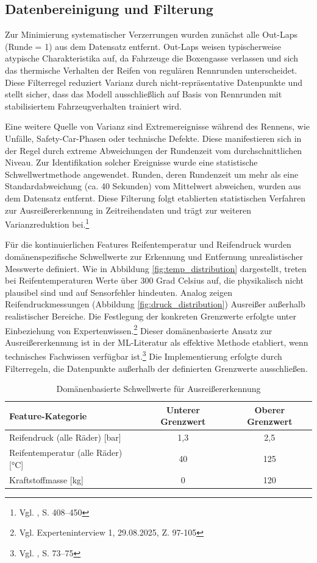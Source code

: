 \subsection{Datenbereinigung und Filterung}

Zur Minimierung systematischer Verzerrungen wurden zunächst alle Out-Laps (Runde = 1) aus dem Datensatz entfernt. Out-Laps weisen typischerweise atypische Charakteristika auf, da Fahrzeuge die Boxengasse verlassen und sich das thermische Verhalten der Reifen von regulären Rennrunden unterscheidet. Diese Filterregel reduziert Varianz durch nicht-repräsentative Datenpunkte und stellt sicher, dass das Modell ausschließlich auf Basis von Rennrunden mit stabilisiertem Fahrzeugverhalten trainiert wird.

Eine weitere Quelle von Varianz sind Extremereignisse während des Rennens, wie Unfälle, Safety-Car-Phasen oder technische Defekte. Diese manifestieren sich in der Regel durch extreme Abweichungen der Rundenzeit vom durchschnittlichen Niveau. Zur Identifikation solcher Ereignisse wurde eine statistische Schwellwertmethode angewendet. Runden, deren Rundenzeit um mehr als eine Standardabweichung (ca. 40 Sekunden) vom Mittelwert abweichen, wurden aus dem Datensatz entfernt. Diese Filterung folgt etablierten statistischen Verfahren zur Ausreißererkennung in Zeitreihendaten und trägt zur weiteren Varianzreduktion bei.\footnote{Vgl. \cite{Box2015}, S. 408–450}

Für die kontinuierlichen Features Reifentemperatur und Reifendruck wurden domänenspezifische Schwellwerte zur Erkennung und Entfernung unrealistischer Messwerte definiert. Wie in Abbildung \ref{fig:temp_distribution} dargestellt, treten bei Reifentemperaturen Werte über 300 Grad Celsius auf, die physikalisch nicht plausibel sind und auf Sensorfehler hindeuten. Analog zeigen Reifendruckmessungen (Abbildung \ref{fig:druck_distribution}) Ausreißer außerhalb realistischer Bereiche. 
Die Festlegung der konkreten Grenzwerte erfolgte unter Einbeziehung von Expertenwissen.\footnote{Vgl. Experteninterview 1, 29.08.2025, Z. 97-105} 
Dieser domänenbasierte Ansatz zur Ausreißererkennung ist in der \ac{ML}-Literatur als effektive Methode etabliert, wenn technisches Fachwissen verfügbar ist.\footnote{Vgl. \cite{Kuhn2019}, S. 73–75} Die Implementierung erfolgte durch Filterregeln, die Datenpunkte außerhalb der definierten Grenzwerte ausschließen.

\begin{table}[H]
  \centering
  \begin{tabular}{lcc}
    \toprule
    \textbf{Feature-Kategorie} & \textbf{Unterer Grenzwert} & \textbf{Oberer Grenzwert} \\
    \midrule
    Reifendruck (alle Räder) [bar] & 1,3 & 2,5 \\
    Reifentemperatur (alle Räder) [°C] & 40 & 125 \\
    Kraftstoffmasse [kg] & 0 & 120 \\
    \bottomrule
  \end{tabular}
  \caption{Domänenbasierte Schwellwerte für Ausreißererkennung}
  \label{tab:threshold_values}
\end{table}


